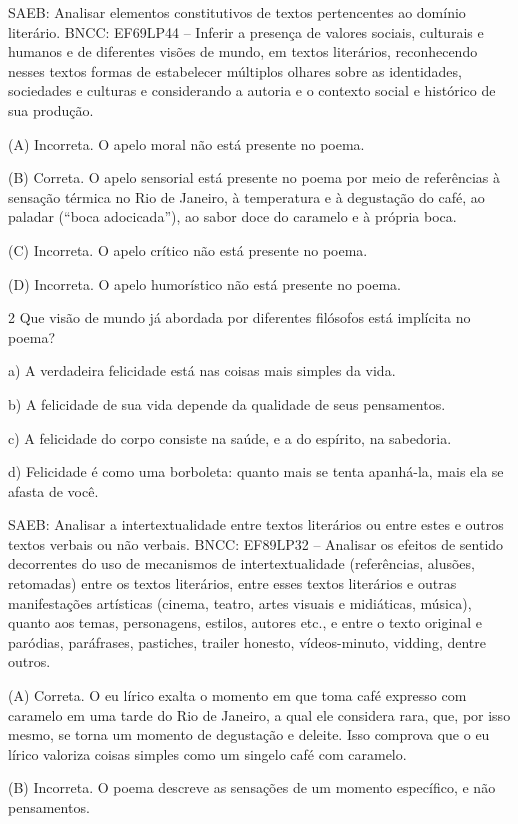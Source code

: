 SAEB: Analisar elementos constitutivos de textos pertencentes ao domínio
literário. BNCC: EF69LP44 -- Inferir a presença de valores sociais,
culturais e humanos e de diferentes visões de mundo, em textos
literários, reconhecendo nesses textos formas de estabelecer múltiplos
olhares sobre as identidades, sociedades e culturas e considerando a
autoria e o contexto social e histórico de sua produção.

(A) Incorreta. O apelo moral não está presente no poema.

(B) Correta. O apelo sensorial está presente no poema por meio de
referências à sensação térmica no Rio de Janeiro, à temperatura e à
degustação do café, ao paladar (``boca adocicada''), ao sabor doce do
caramelo e à própria boca.

(C) Incorreta. O apelo crítico não está presente no poema.

(D) Incorreta. O apelo humorístico não está presente no poema.

\num{2} Que visão de mundo já abordada por diferentes filósofos está
implícita no poema?

a) A verdadeira felicidade está nas coisas mais simples da vida.

b) A felicidade de sua vida depende da qualidade de seus pensamentos.

c) A felicidade do corpo consiste na saúde, e a do espírito, na
sabedoria.

d) Felicidade é como uma borboleta: quanto mais se tenta apanhá-la, mais
ela se afasta de você.

SAEB: Analisar a intertextualidade entre textos literários ou entre
estes e outros textos verbais ou não verbais. BNCC: EF89LP32 -- Analisar
os efeitos de sentido decorrentes do uso de mecanismos de
intertextualidade (referências, alusões, retomadas) entre os textos
literários, entre esses textos literários e outras manifestações
artísticas (cinema, teatro, artes visuais e midiáticas, música), quanto
aos temas, personagens, estilos, autores etc., e entre o texto original
e paródias, paráfrases, pastiches, trailer honesto, vídeos-minuto,
vidding, dentre outros.

(A) Correta. O eu lírico exalta o momento em que toma café expresso com
caramelo em uma tarde do Rio de Janeiro, a qual ele considera rara, que,
por isso mesmo, se torna um momento de degustação e deleite. Isso
comprova que o eu lírico valoriza coisas simples como um singelo café
com caramelo.

(B) Incorreta. O poema descreve as sensações de um momento específico, e
não pensamentos.

